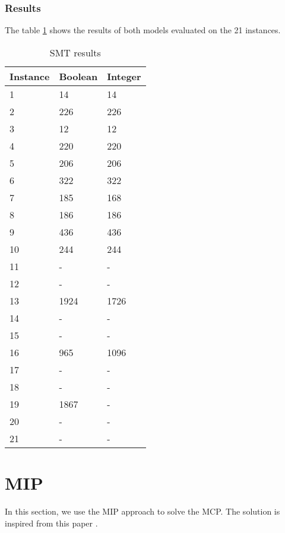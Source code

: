 \documentclass{article}
\begin{document}
\subsubsection{Results}
The table \ref{table:smt-table} shows the results of both models evaluated on the 21 instances.
\begin{table}[h!]
    \centering
    \begin{tabular}{|l|l|l|}
    \hline
        Instance & Boolean & Integer \\ \hline
        1 & 14 & 14 \\ \hline
        2 & 226 & 226 \\ \hline
        3 & 12 & 12 \\ \hline
        4 & 220 & 220 \\ \hline
        5 & 206 & 206 \\ \hline
        6 & 322 & 322 \\ \hline
        7 & 185 & 168 \\ \hline
        8 & 186 & 186 \\ \hline
        9 & 436 & 436 \\ \hline
        10 & 244 & 244 \\ \hline
        11 & - & - \\ \hline
        12 & - & - \\ \hline
        13 & 1924 & 1726 \\ \hline
        14 & - & - \\ \hline
        15 & - & - \\ \hline
        16 & 965 & 1096 \\ \hline
        17 & - & - \\ \hline
        18 & - & - \\ \hline
        19 & 1867 & - \\ \hline
        20 & - & - \\ \hline
        21 & - & - \\ \hline
    \end{tabular}
\label{table:smt-table}
\caption{SMT results}
\end{table}

\section{MIP}
In this section, we use the MIP approach to solve the MCP. The solution is inspired from this paper \cite{kaempfer2019learningmultipletravelingsalesmen}.
\end{document}
